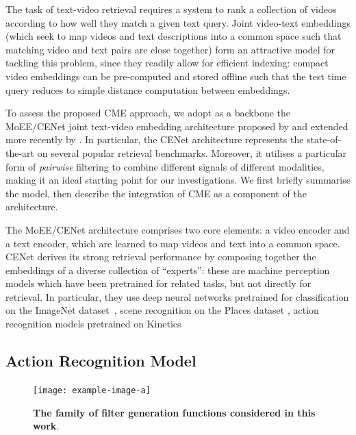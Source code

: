 The task of text-video retrieval requires a system to rank a collection of videos according to how well they match a given text query.  Joint video-text embeddings (which seek to map videos and text descriptions into a common space such that matching video and text pairs are close together) form an attractive model for tackling this problem, since they readily allow for efficient indexing: compact video embeddings can be pre-computed and stored offline such that the test time query reduces to simple distance computation between embeddings.

To assess the proposed CME approach, we adopt as a backbone the MoEE/CENet joint text-video embedding architecture proposed by \cite{miech2018learning} and extended more recently by \cite{liu2019use}.  In particular, the CENet architecture represents the state-of-the-art on several popular retrieval benchmarks.  Moreover, it utilises a particular form of \textit{pairwise} filtering to combine different signals of different modalities, making it an ideal starting point for our investigations.   We first briefly summarise the model, then describe the integration of CME as a component of the architecture.

The MoEE/CENet architecture comprises two core elements: a video encoder and a text encoder, which are learned to map videos and text into a common space.  CENet derives its strong retrieval performance by composing together the embeddings of a diverse collection of ``experts'': these are machine perception models which have been pretrained for related tasks, but not directly for retrieval.  In particular, they use deep neural networks pretrained for classification on the ImageNet dataset~\cite{deng2009imagenet}, scene recognition on the Places dataset \cite{zhou2017places}, action recognition models pretrained on Kinetics~\cite{}


\subsection{Action Recognition Model}

\begin{figure}
    \centering
    \texttt{[image: example-image-a]}
    \caption{\textbf{The family of filter generation functions considered in this work}.}
    \label{fig:reasoning}
\end{figure}